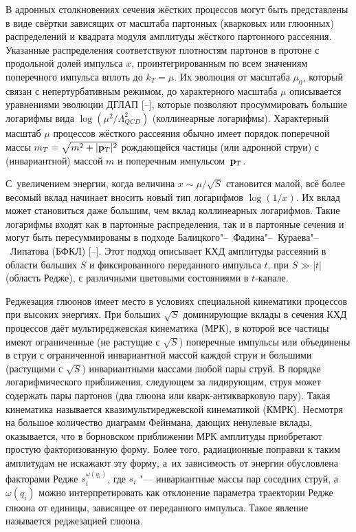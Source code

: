 В адронных столкновениях сечения жёстких процессов могут быть представлены в виде свёртки зависящих от масштаба  партонных (кварковых или глюонных) распределений и квадрата модуля амплитуды жёсткого партонного рассеяния. Указанные распределения соответствуют плотностям партонов в протоне с продольной долей импульса $x$, проинтегрированным по всем значениям поперечного импульса вплоть до $k_T=\mu$. Их эволюция от масштаба $\mu_0$, который связан с непертурбативным режимом, до характерного масштаба $\mu$ описывается уравнениями эволюции ДГЛАП [--], которые позволяют просуммировать большие логарифмы вида $\log(\mu^2/\Lambda_{QCD}^2)$ (коллинеарные логарифмы). Характерный масштаб $\mu$ процессов жёсткого рассеяния обычно имеет порядок поперечной массы $m_T=\sqrt{m^2+|{\bf p}_T|^2}$ рождающейся частицы (или адронной струи) с (инвариантной) массой $m$ и поперечным импульсом~${\bf p}_T$. 

С~увеличением энергии, когда величина $x \sim \mu/\sqrt S$ становится малой, всё более весомый вклад начинает вносить новый тип логарифмов $\log(1/x)$. Их вклад может становиться даже большим, чем вклад коллинеарных логарифмов. Такие логарифмы входят как в партонные распределения, так и в партонные сечения и могут быть пересуммированы в подходе Балицкого"--~Фадина"--~Кураева"--~Липатова (БФКЛ) [--]. Этот подход описывает КХД амплитуды рассеяний в области больших $S$ и фиксированного переданного импульса $t$, при $S \gg |t|$ (область Редже), с различными цветовыми состояниями в $t$-канале.



Реджезация глюонов имеет место в условиях специальной кинематики процессов при высоких энергиях. При больших $\sqrt S$ доминирующие вклады в сечения КХД процессов даёт мультиреджевская кинематика (МРК), в которой все частицы имеют ограниченные (не растущие с $\sqrt S$) поперечные импульсы или объединены в струи с ограниченной инвариантной массой каждой струи и большими (растущими с $\sqrt S$) инвариантными массами любой пары струй. В порядке логарифмического приближения, следующем за лидирующим, струя может содержать пары партонов (два глюона или кварк-антикварковую пару). Такая кинематика называется квазимультиреджевской кинематикой (КМРК). Несмотря на большое количество диаграмм Фейнмана, дающих ненулевые вклады, оказывается, что в борновском приближении МРК амплитуды приобретают простую факторизованную форму. Более того, радиационные поправки к таким амплитудам не искажают эту форму, а~их зависимость от энергии обусловлена факторами Редже $s_i^{\omega(q_i)}$, где $s_i$ "--- инвариантные массы пар соседних струй, а $\omega(q_i)$ можно интерпретировать как отклонение параметра траектории Редже глюона от единицы, зависящее от переданного импульса.  Такое явление называется реджезацией глюона.





